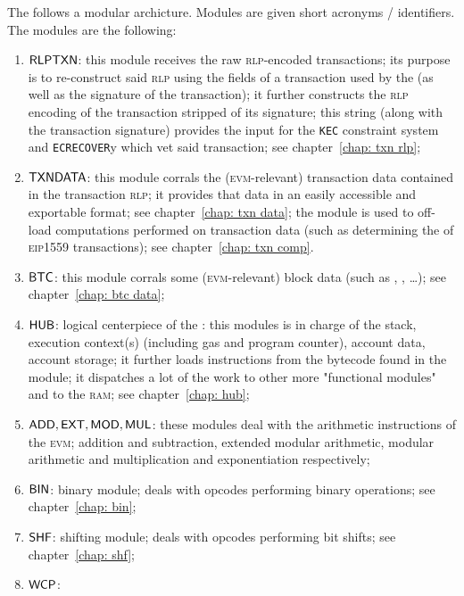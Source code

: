 The \zkEvm{} follows a modular archicture. Modules are given short acronyms / identifiers. The modules are the following:
\begin{enumerate}
	\item $\textsf{RLPTXN}$:
		this module receives the raw \textsc{rlp}-encoded transactions;
		its purpose is to re-construct said \textsc{rlp} using the fields of a transaction used by the \zkEvm{} (as well as the signature of the transaction);
		it further constructs the \textsc{rlp} encoding of the transaction stripped of its signature;
		this string (along with the transaction signature) provides the input for the \texttt{KEC} constraint system and \texttt{ECRECOVER}y which vet said transaction;
		see chapter~\ref{chap: txn rlp};
	\item $\textsf{TXNDATA}{}$:
		this module corrals the (\textsc{evm}-relevant) transaction data contained in the transaction \textsc{rlp};
		it provides that data in an easily accessible and exportable format;
		see chapter~\ref{chap: txn data};
		\saNote{} the \btcMod{} module is used to off-load computations performed on transaction data (such as determining the  of \textsc{eip1559} transactions); see chapter~\ref{chap: txn comp}.
	\item $\textsf{BTC}{}$:
		this module corrals some (\textsc{evm}-relevant) block data (such as , , \dots);
		see chapter~\ref{chap: btc data};
	\item $\textsf{HUB}{}$:
		logical centerpiece of the \zkEvm{}: this modules is in charge of the stack, execution context(s) (including gas and program counter), account data, account storage;
		it further loads instructions from the bytecode found in the \romMod{} module;
		it dispatches a lot of the work to other more "functional modules" and to the \textsc{ram};
		see chapter~\ref{chap: hub};
	\item $\textsf{ADD}{}, \textsf{EXT}{}, \textsf{MOD}{}, \textsf{MUL}{}$:
		these modules deal with the arithmetic instructions of the \textsc{evm};
		addition and subtraction, extended modular arithmetic, modular arithmetic and multiplication and exponentiation respectively;
	\item $\textsf{BIN}{}$:
		binary module;
		deals with opcodes performing binary operations;
		see chapter~\ref{chap: bin};
	\item $\textsf{SHF}{}$:
		shifting module;
		deals with opcodes performing bit shifts;
		see chapter~\ref{chap: shf};
	\item $\textsf{WCP}{}$:

\end{enumerate}
